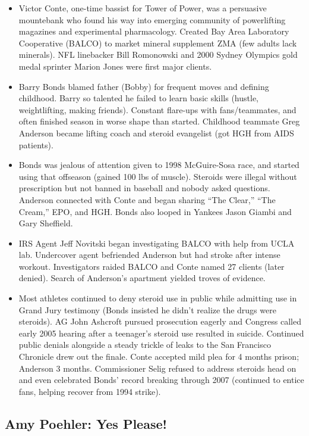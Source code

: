 \documentclass[
]{article}
\begin{document}
\begin{itemize}
\item
  Victor Conte, one-time bassist for Tower of Power, was a persuasive
  mountebank who found his way into emerging community of powerlifting
  magazines and experimental pharmacology. Created Bay Area Laboratory
  Cooperative (BALCO) to market mineral supplement ZMA (few adults lack
  minerals). NFL linebacker Bill Romonowski and 2000 Sydney Olympics
  gold medal sprinter Marion Jones were first major clients.
\item
  Barry Bonds blamed father (Bobby) for frequent moves and defining
  childhood. Barry so talented he failed to learn basic skills (hustle,
  weightlifting, making friends). Constant flare-ups with
  fans/teammates, and often finished season in worse shape than started.
  Childhood teammate Greg Anderson became lifting coach and steroid
  evangelist (got HGH from AIDS patients).
\item
  Bonds was jealous of attention given to 1998 McGuire-Sosa race, and
  started using that offseason (gained 100 lbs of muscle). Steroids were
  illegal without prescription but not banned in baseball and nobody
  asked questions. Anderson connected with Conte and began sharing ``The
  Clear,'' ``The Cream,'' EPO, and HGH. Bonds also looped in Yankees
  Jason Giambi and Gary Sheffield.
\item
  IRS Agent Jeff Novitski began investigating BALCO with help from UCLA
  lab. Undercover agent befriended Anderson but had stroke after intense
  workout. Investigators raided BALCO and Conte named 27 clients (later
  denied). Search of Anderson's apartment yielded troves of evidence.
\item
  Most athletes continued to deny steroid use in public while admitting
  use in Grand Jury testimony (Bonds insisted he didn't realize the
  drugs were steroids). AG John Ashcroft pursued prosecution eagerly and
  Congress called early 2005 hearing after a teenager's steroid use
  resulted in suicide. Continued public denials alongside a steady
  trickle of leaks to the San Francisco Chronicle drew out the finale.
  Conte accepted mild plea for 4 months prison; Anderson 3 months.
  Commissioner Selig refused to address steroids head on and even
  celebrated Bonds' record breaking through 2007 (continued to entice
  fans, helping recover from 1994 strike).
\end{itemize}

\hypertarget{amy-poehler-yes-please}{%
\subsection{Amy Poehler: Yes Please!}\label{amy-poehler-yes-please}}
\end{document}
